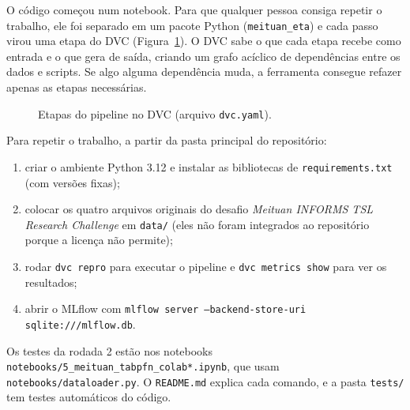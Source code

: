 \documentclass[11pt,a4paper]{article}
\begin{document}
O código começou num notebook. Para que qualquer pessoa consiga repetir o trabalho, ele foi
separado em um pacote Python (\texttt{meituan\_eta}) e cada passo virou uma etapa do DVC
(Figura~\ref{fig:pipe}). O DVC sabe o que cada etapa recebe como entrada e o que gera de saída,
criando um grafo acíclico de dependências entre os dados e scripts. Se algo alguma dependência
muda, a ferramenta consegue refazer apenas as etapas necessárias.

\begin{figure}[H]
\centering
{}
\caption{Etapas do pipeline no DVC (arquivo \texttt{dvc.yaml}).}
\label{fig:pipe}
\end{figure}

\noindent Para repetir o trabalho, a partir da pasta principal do repositório:
\begin{enumerate}
  \item criar o ambiente Python 3.12 e instalar as bibliotecas de \texttt{requirements.txt}
        (com versões fixas);
  \item colocar os quatro arquivos originais do desafio \emph{Meituan INFORMS TSL Research Challenge}
  em \texttt{data/} (eles não foram integrados ao repositório porque a licença não permite);
  \item rodar \texttt{dvc repro} para executar o pipeline e \texttt{dvc metrics show} para ver
        os resultados;
  \item abrir o MLflow com \texttt{mlflow server --backend-store-uri sqlite:///mlflow.db}.
\end{enumerate}
Os testes da rodada 2 estão nos notebooks \texttt{notebooks/5\_meituan\_tabpfn\_colab*.ipynb},
que usam \texttt{notebooks/dataloader.py}. O \texttt{README.md} explica cada comando, e a pasta
\texttt{tests/} tem testes automáticos do código.
\end{document}
